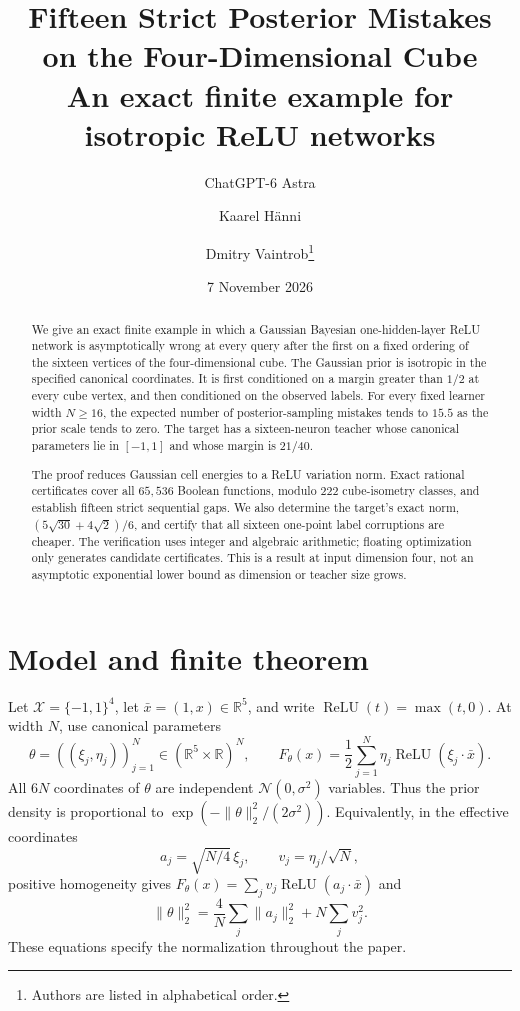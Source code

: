 \documentclass[11pt]{article}
\title{Fifteen Strict Posterior Mistakes on the Four-Dimensional Cube\\[3pt]
\large An exact finite example for isotropic ReLU networks}
\author{ChatGPT-6 Astra \and Kaarel H\"anni \and Dmitry Vaintrob\thanks{Authors are listed in alphabetical order.}}
\date{7 November 2026}
\theoremstyle{remark}\newtheorem{remark}[theorem]{Remark}
\newcommand{\relu}{\operatorname{ReLU}}
\newcommand{\R}{\mathbb R}
\newcommand{\X}{\mathcal X}
\newcommand{\1}{\mathbf 1}
\begin{document}
\maketitle
\begin{abstract}
We give an exact finite example in which a Gaussian Bayesian one-hidden-layer ReLU network is asymptotically wrong at every query after the first on a fixed ordering of the sixteen vertices of the four-dimensional cube. The Gaussian prior is isotropic in the specified canonical coordinates. It is first conditioned on a margin greater than $1/2$ at every cube vertex, and then conditioned on the observed labels. For every fixed learner width $N\ge16$, the expected number of posterior-sampling mistakes tends to $15.5$ as the prior scale tends to zero. The target has a sixteen-neuron teacher whose canonical parameters lie in $[-1,1]$ and whose margin is $21/40$.

The proof reduces Gaussian cell energies to a ReLU variation norm. Exact rational certificates cover all $65{,}536$ Boolean functions, modulo $222$ cube-isometry classes, and establish fifteen strict sequential gaps. We also determine the target's exact norm, $(5\sqrt{30}+4\sqrt2)/6$, and certify that all sixteen one-point label corruptions are cheaper. The verification uses integer and algebraic arithmetic; floating optimization only generates candidate certificates. This is a result at input dimension four, not an asymptotic exponential lower bound as dimension or teacher size grows.
\end{abstract}

\section{Model and finite theorem}
Let $\X=\{-1,1\}^4$, let $\bar x=(1,x)\in\R^5$, and write $\relu(t)=\max(t,0)$. At width $N$, use canonical parameters
\[
\theta=((\xi_j,\eta_j))_{j=1}^N\in(\R^5\times\R)^N,
\qquad
F_\theta(x)=\frac12\sum_{j=1}^N\eta_j\relu(\xi_j\cdot\bar x).
\tag{1}\label{eq:canonical}
\]
All $6N$ coordinates of $\theta$ are independent $\mathcal N(0,\sigma^2)$ variables. Thus the prior density is proportional to $\exp(-\|\theta\|_2^2/(2\sigma^2))$.
Equivalently, in the effective coordinates
\[
a_j=\sqrt{N/4}\,\xi_j,\qquad v_j=\eta_j/\sqrt N,
\]
positive homogeneity gives $F_\theta(x)=\sum_jv_j\relu(a_j\cdot\bar x)$ and
\[
\|\theta\|_2^2=\frac4N\sum_j\|a_j\|_2^2+N\sum_jv_j^2.
\tag{2}\label{eq:energy}
\]
These equations specify the normalization throughout the paper.
\end{document}
